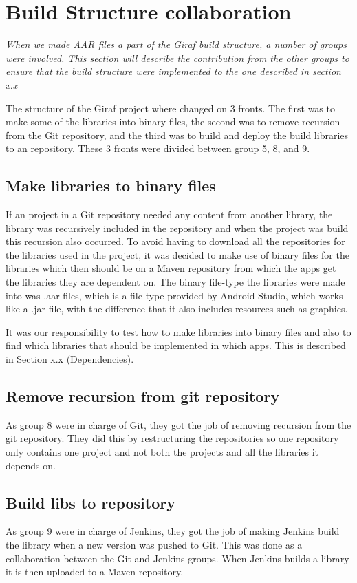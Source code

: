 \section{Build Structure collaboration}\label{Collab_secBuildStructure}
\textit{When we made AAR files a part of the Giraf build structure, a number of groups were involved. This section will describe the contribution from the other groups to ensure that the build structure were implemented to the one described in section x.x}

The structure of the Giraf project where changed on 3 fronts. The first was to make some of the libraries into binary files, the second was to remove recursion from the Git repository, and the third was to build and deploy the build libraries to an repository. These 3 fronts were divided between group 5, 8, and 9. 

\subsection{Make libraries to binary files}
If an project in a Git repository needed any content from another library, the library was recursively included in the repository and when the project was build this recursion also occurred. To avoid having to download all the repositories for the libraries used in the project, it was decided to make use of binary files for the libraries which then should be on a Maven repository from which the apps get the libraries they are dependent on. The binary file-type the libraries were made into was .aar files, which is a file-type provided by Android Studio, which works like a .jar file, with the difference that it also includes resources such as graphics.

It was our responsibility to test how to make libraries into binary files and also to find which libraries that should be implemented in which apps. This is described in Section x.x (Dependencies).


\subsection{Remove recursion from git repository}
As group 8 were in charge of Git, they got the job of removing recursion from the git repository. They did this by restructuring the repositories so one repository only contains one project and not both the projects and all the libraries it depends on.

\subsection{Build libs to repository}
As group 9 were in charge of Jenkins, they got the job of making Jenkins build the library when a new version was pushed to Git. This was done as a collaboration between the Git and Jenkins groups. When Jenkins builds a library it is then uploaded to a Maven repository.

